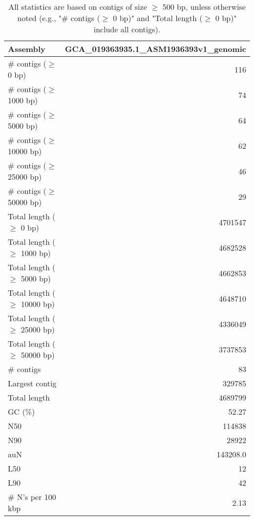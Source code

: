 \documentclass[12pt,a4paper]{article}
\begin{document}
\begin{table}[ht]
\begin{center}
\caption{All statistics are based on contigs of size $\geq$ 500 bp, unless otherwise noted (e.g., "\# contigs ($\geq$ 0 bp)" and "Total length ($\geq$ 0 bp)" include all contigs).}
\begin{tabular}{|l*{1}{|r}|}
\hline
Assembly & GCA\_019363935.1\_ASM1936393v1\_genomic \\ \hline
\# contigs ($\geq$ 0 bp) & 116 \\ \hline
\# contigs ($\geq$ 1000 bp) & 74 \\ \hline
\# contigs ($\geq$ 5000 bp) & 64 \\ \hline
\# contigs ($\geq$ 10000 bp) & 62 \\ \hline
\# contigs ($\geq$ 25000 bp) & 46 \\ \hline
\# contigs ($\geq$ 50000 bp) & 29 \\ \hline
Total length ($\geq$ 0 bp) & 4701547 \\ \hline
Total length ($\geq$ 1000 bp) & 4682528 \\ \hline
Total length ($\geq$ 5000 bp) & 4662853 \\ \hline
Total length ($\geq$ 10000 bp) & 4648710 \\ \hline
Total length ($\geq$ 25000 bp) & 4336049 \\ \hline
Total length ($\geq$ 50000 bp) & 3737853 \\ \hline
\# contigs & 83 \\ \hline
Largest contig & 329785 \\ \hline
Total length & 4689799 \\ \hline
GC (\%) & 52.27 \\ \hline
N50 & 114838 \\ \hline
N90 & 28922 \\ \hline
auN & 143208.0 \\ \hline
L50 & 12 \\ \hline
L90 & 42 \\ \hline
\# N's per 100 kbp & 2.13 \\ \hline
\end{tabular}
\end{center}
\end{table}
\end{document}
